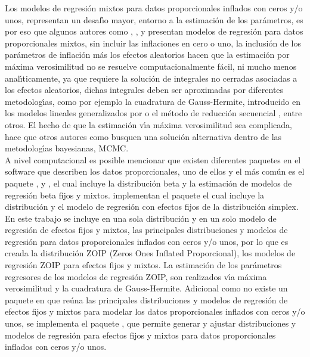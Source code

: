 Los modelos de regresi\'{o}n mixtos para datos proporcionales inflados con ceros y/o unos, re\-pre\-sen\-tan un desaf\'{\i}o mayor, entorno a la estimaci\'{o}n de los par\'{a}metros, es por eso que algunos autores como \cite{Usuga1}, \cite{Bonat2}, \cite{Song1} y \cite{Stasinopoulos2} presentan modelos de regresi\'{o}n para datos proporcionales mixtos, sin incluir las inflaciones en cero o uno, la inclusi\'{o}n de los par\'{a}metros de inflaci\'{o}n m\'{a}s los efectos aleatorios hacen que la estimaci\'{o}n por m\'{a}xima verosimilitud no se resuelve computacionalmente f\'{a}cil, ni mucho menos anal\'{\i}ticamente, ya que requiere la soluci\'{o}n de integrales no cerradas asociadas a los efectos aleatorios, dichas integrales deben ser aproximadas por diferentes metodolog\'{\i}as, como por ejemplo la cuadratura de Gauss-Hermite, introducido en los modelos lineales generalizados por \cite{Fahrmeir1} o el m\'{e}todo de reducci\'{o}n secuencial \citep{Ogden1}, entre otros. El hecho de que la estimaci\'{o}n v\'{\i}a m\'{a}xima verosimilitud sea complicada, hace que otros autores como \cite{Galvis1} busquen una soluci\'{o}n alternativa dentro de las metodolog\'{\i}as bayesianas, MCMC.\\

A nivel computacional es posible mencionar que existen diferentes paquetes en el software  que describen los datos proporcionales, uno de ellos y el m\'{a}s com\'{u}n es el paquete  \citep{Zeileis1}, \citep{Ferrari1} y \citep{Simas1}, el cual incluye la distribuci\'{o}n beta y la estimaci\'{o}n de modelos de regresi\'{o}n beta fijos y mixtos. \cite{Qiu1} implementan el paquete  el cual incluye la distribuci\'{o}n y el modelo de regresi\'{o}n con efectos fijos de la distribuci\'{o}n simplex.\\

En este trabajo se incluye en una sola distribuci\'{o}n y en un solo modelo de regresi\'{o}n de efectos fijos y mixtos, las principales distribuciones y modelos de regresi\'{o}n para datos proporcionales inflados con ceros y/o unos, por lo que es creada la distribuci\'{o}n ZOIP (Zeros Ones Inflated Proporcional), los modelos de regresi\'{o}n ZOIP para efectos fijos y mixtos. La estimaci\'{o}n de los par\'{a}metros regresores de los modelos de regresi\'{o}n ZOIP, son realizados v\'{\i}a m\'{a}xima verosimilitud y la cuadratura de Gauss-Hermite. Adicional como no existe un paquete en  que re\'{u}na las principales distribuciones y modelos de regresi\'{o}n de efectos fijos y mixtos para modelar los datos proporcionales inflados con ceros y/o unos, se implementa el paquete , que permite generar y ajustar distribuciones y modelos de regresi\'{o}n para efectos fijos y mixtos para datos proporcionales inflados con ceros y/o unos.

